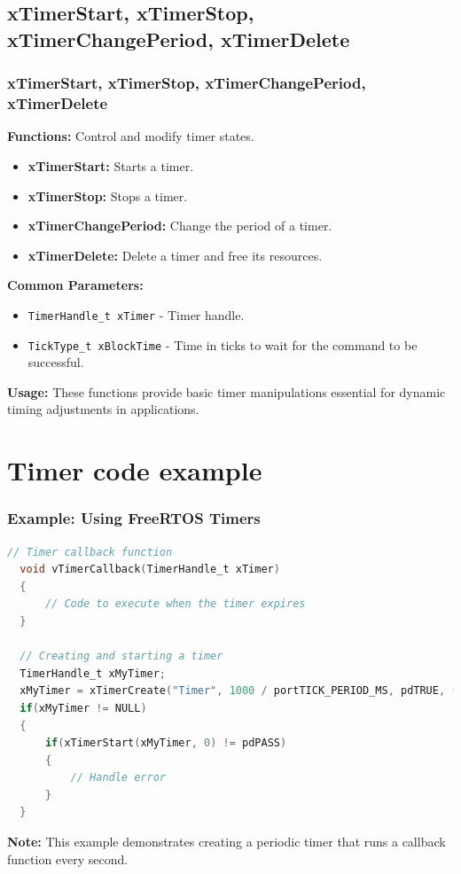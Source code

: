 \documentclass[10pt]{beamer}
\begin{document}
\subsection{xTimerStart, xTimerStop, xTimerChangePeriod, xTimerDelete}
  \begin{frame}[fragile]
    \frametitle{xTimerStart, xTimerStop, xTimerChangePeriod, xTimerDelete}
    \textbf{Functions:} Control and modify timer states.
    \begin{itemize}
      \item \textbf{xTimerStart:} Starts a timer.
      \item \textbf{xTimerStop:} Stops a timer.
      \item \textbf{xTimerChangePeriod:} Change the period of a timer.
      \item \textbf{xTimerDelete:} Delete a timer and free its resources.
    \end{itemize}
    \textbf{Common Parameters:}
    \begin{itemize}
      \item \texttt{TimerHandle\_t xTimer} - Timer handle.
      \item \texttt{TickType\_t xBlockTime} - Time in ticks to wait for the command to be successful.
    \end{itemize}
    \textbf{Usage:} These functions provide basic timer manipulations essential for dynamic timing adjustments in applications.
  \end{frame}

\section{Timer code example}

\begin{frame}[fragile]
    \frametitle{Example: Using FreeRTOS Timers}
    \begin{lstlisting}[language=C, basicstyle=\ttfamily\small]
  // Timer callback function
  void vTimerCallback(TimerHandle_t xTimer)
  {
      // Code to execute when the timer expires
  }
  
  // Creating and starting a timer
  TimerHandle_t xMyTimer;
  xMyTimer = xTimerCreate("Timer", 1000 / portTICK_PERIOD_MS, pdTRUE, (void *) 0, vTimerCallback);
  if(xMyTimer != NULL)
  {
      if(xTimerStart(xMyTimer, 0) != pdPASS)
      {
          // Handle error
      }
  }
    \end{lstlisting}
    \textbf{Note:} This example demonstrates creating a periodic timer that runs a callback function every second.
\end{frame}
\end{document}
